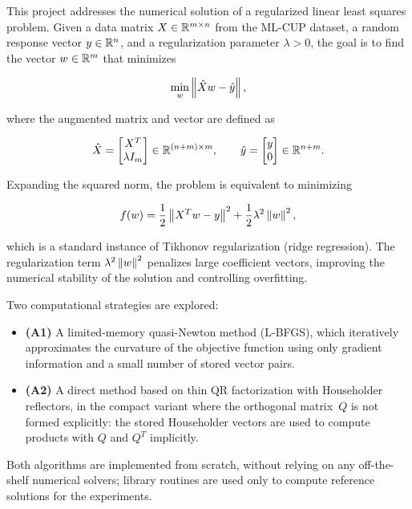 \label{sec:intro}

\noindent This project addresses the numerical solution of a regularized linear least squares problem. 
Given a data matrix $X \in \mathbb{R}^{m \times n}$ from the ML-CUP dataset, a random response vector 
$y \in \mathbb{R}^n$, and a regularization parameter $\lambda > 0$, the goal is to find the vector 
$w \in \mathbb{R}^m$ that minimizes

\begin{equation}
\label{eq:problem}
    \min_w \left\|\hat{X} w - \hat{y}\right\|,
\end{equation}

\noindent where the augmented matrix and vector are defined as

\begin{equation}
\label{eq:augmented}
    \hat{X} = \begin{bmatrix} X^T \\ \lambda I_m \end{bmatrix} \in \mathbb{R}^{(n+m) \times m}, 
    \qquad
    \hat{y} = \begin{bmatrix} y \\ 0 \end{bmatrix} \in \mathbb{R}^{n+m}.
\end{equation}

\noindent Expanding the squared norm, the problem is equivalent to minimizing

\begin{equation}
\label{eq:expanded}
    f(w) = \frac{1}{2}\left\|X^T w - y\right\|^2 + \frac{1}{2}\lambda^2 \left\|w\right\|^2,
\end{equation}

\noindent which is a standard instance of Tikhonov regularization (ridge regression). 
The regularization term $\lambda^2\left\|w\right\|^2$ penalizes large coefficient vectors, 
improving the numerical stability of the solution and controlling overfitting.

\noindent Two computational strategies are explored:

\begin{itemize}[nosep]
    \item \textbf{(A1)} A limited-memory quasi-Newton method (L-BFGS), which iteratively 
    approximates the curvature of the objective function using only gradient information 
    and a small number of stored vector pairs.
    \item \textbf{(A2)} A direct method based on thin QR factorization with Householder
    reflectors, in the compact variant where the orthogonal matrix~$Q$ is not formed
    explicitly: the stored Householder vectors are used to compute products with
    $Q$ and $Q^T$ implicitly.
\end{itemize}

\noindent Both algorithms are implemented from scratch, without relying on any
off-the-shelf numerical solvers; library routines are used only to compute
reference solutions for the experiments.